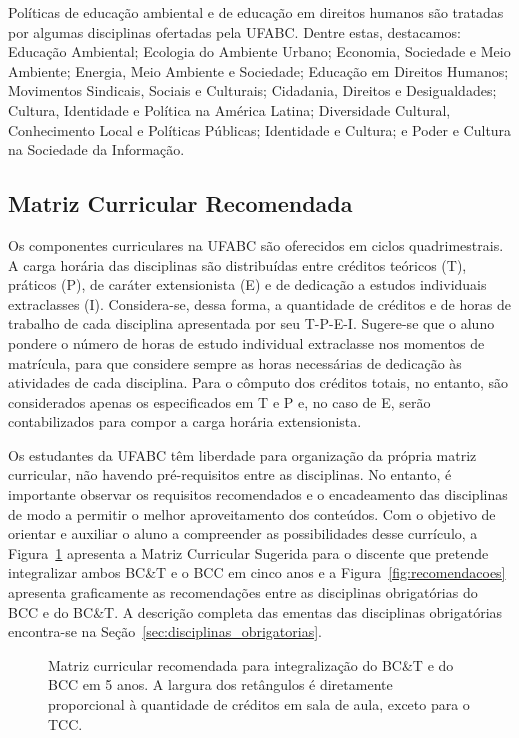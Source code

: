 Políticas de educação ambiental e de educação em direitos humanos são tratadas
por algumas disciplinas ofertadas pela UFABC.
Dentre estas, destacamos:
Educação Ambiental;
Ecologia do Ambiente Urbano;
Economia, Sociedade e Meio Ambiente;
Energia, Meio Ambiente e Sociedade;
Educação em Direitos Humanos;
Movimentos Sindicais, Sociais e Culturais;
Cidadania, Direitos e Desigualdades;
Cultura, Identidade e Política na América Latina;
Diversidade Cultural, Conhecimento Local e Políticas Públicas;
Identidade e Cultura; e
Poder e Cultura na Sociedade da Informação.



\subsection{Matriz Curricular Recomendada}
\label{sec:matriz_curricular}

Os componentes curriculares na UFABC são oferecidos em ciclos quadrimestrais.
A carga horária das disciplinas são distribuídas entre créditos teóricos (T),
práticos (P), de caráter extensionista (E) e de dedicação a estudos
individuais extraclasses (I).
Considera-se, dessa forma, a quantidade de créditos e de horas de trabalho de
cada disciplina apresentada por seu T-P-E-I.
Sugere-se que o aluno pondere o número de horas de estudo individual
extraclasse nos momentos de matrícula, para que considere sempre as horas
necessárias de dedicação às atividades de cada disciplina. 
Para o cômputo dos créditos totais, no entanto, são considerados apenas os
especificados em T e P e, no caso de E, serão contabilizados para compor a
carga horária extensionista.


Os estudantes da UFABC têm liberdade para organização da própria matriz
curricular, não havendo pré-requisitos entre as disciplinas.
No entanto, é importante observar os requisitos recomendados e o encadeamento
das disciplinas de modo a permitir o melhor aproveitamento dos conteúdos.
Com o objetivo de orientar e auxiliar o aluno a compreender as possibilidades desse
currículo, a Figura~\ref{fig:matriz_curricular} apresenta a Matriz Curricular
Sugerida para o discente que pretende integralizar ambos BC\&T e o BCC em cinco
anos e a Figura~\ref{fig:recomendacoes} apresenta graficamente as recomendações
entre as disciplinas obrigatórias do BCC e do BC\&T.
A descrição completa das ementas das disciplinas obrigatórias encontra-se na
Seção~\ref{sec:disciplinas_obrigatorias}.

\begin{figure}
    \centering
    \resizebox{\textwidth}{!}{}
    \caption{Matriz curricular recomendada para integralização do BC\&T e do
    BCC em 5 anos. A largura dos retângulos é diretamente proporcional à
    quantidade de créditos em sala de aula, exceto para o TCC.}
    \label{fig:matriz_curricular}
\end{figure}

